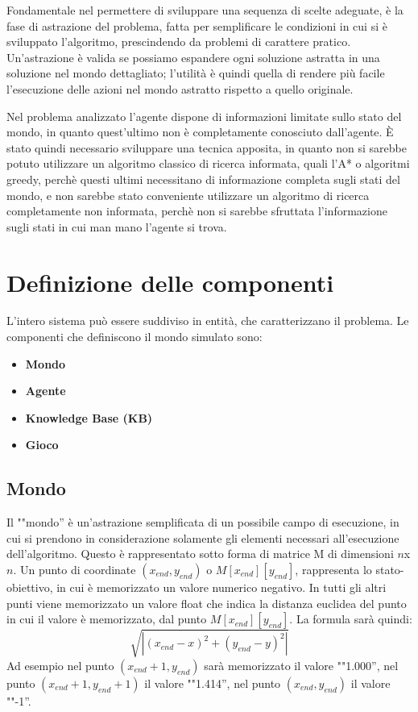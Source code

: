 Fondamentale nel permettere di sviluppare una sequenza di scelte adeguate, è la fase di astrazione del problema, fatta per semplificare le condizioni in cui si è sviluppato l'algoritmo, prescindendo da problemi di carattere pratico. Un'astrazione è valida se possiamo espandere ogni soluzione astratta in una soluzione nel mondo dettagliato; l'utilità è quindi quella di rendere più facile l'esecuzione delle azioni nel mondo astratto rispetto a quello originale. 

Nel problema analizzato l'agente dispone di informazioni limitate sullo stato del mondo, in quanto quest'ultimo non è completamente conosciuto dall'agente. È stato quindi necessario sviluppare una tecnica apposita, in quanto non si sarebbe potuto utilizzare un algoritmo classico di ricerca informata, quali l'A* o algoritmi greedy, perchè questi ultimi necessitano di informazione completa sugli stati del mondo, e non sarebbe stato conveniente utilizzare un algoritmo di ricerca completamente non informata, perchè non si sarebbe sfruttata l'informazione sugli stati in cui man mano l'agente si trova.


\section{Definizione delle componenti}
L'intero sistema può essere suddiviso in entità, che caratterizzano il problema. 
Le componenti che definiscono il mondo simulato sono:
\begin{itemize}
\item \textbf{Mondo}

\item \textbf{Agente}

\item \textbf{Knowledge Base (KB)}

\item \textbf{Gioco} 	
\end{itemize}

\subsection{Mondo}
Il ""mondo'' è un'astrazione semplificata di un possibile campo di esecuzione, in cui si prendono in considerazione solamente gli elementi necessari all'esecuzione dell'algoritmo. Questo è rappresentato sotto forma di matrice M di dimensioni $n$x$n$. Un punto di coordinate $(x_{end}, y_{end})$ o $M[x_{end}][y_{end}]$, rappresenta lo stato-obiettivo, in cui è memorizzato un valore numerico negativo. In tutti gli altri punti viene memorizzato un valore float che indica la distanza euclidea del punto in cui il valore è memorizzato, dal punto $M[x_{end}][y_{end}]$. La formula sarà quindi:
$$\sqrt{|(x_{end} - x)^2 + (y_{end} - y)^2|}$$
Ad esempio nel punto $(x_{end}+1, y_{end})$ sarà memorizzato il valore ""1.000'', nel punto $(x_{end}+1, y_{end}+1)$ il valore ""1.414'', nel punto $(x_{end}, y_{end})$ il valore ""-1''. 

